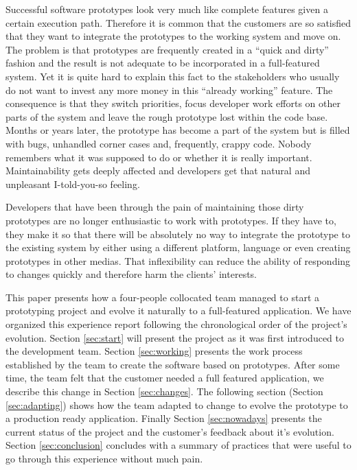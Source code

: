 \documentclass[lnbip]{svmultln}
\begin{document}
Successful software prototypes look very much like complete features
given a certain execution path. Therefore it is common that the
customers are so satisfied that they want to integrate the prototypes
to the working system and move on. The problem is that prototypes are
frequently created in a ``quick and dirty'' fashion and the result is
not adequate to be incorporated in a full-featured system. Yet it is
quite hard to explain this fact to the stakeholders who usually do not
want to invest any more money in this ``already working'' feature. The
consequence is that they switch priorities, focus developer work
efforts on other parts of the system and leave the rough prototype
lost within the code base. Months or years later, the prototype has
become a part of the system but is filled with bugs, unhandled corner
cases and, frequently, crappy code. Nobody remembers what it was
supposed to do or whether it is really important. Maintainability gets
deeply affected and developers get that natural and unpleasant
I-told-you-so feeling. %

Developers that have been through the pain of maintaining those dirty
prototypes are no longer enthusiastic to work with prototypes. If they
have to, they make it so that there will be absolutely no way to
integrate the prototype to the existing system by either using a
different platform, language or even creating prototypes in other
medias. That inflexibility can reduce the ability of responding to
changes quickly and therefore harm the clients' interests.

This paper presents how a four-people collocated team managed to start
a prototyping project and evolve it naturally to a full-featured
application.  We have organized this experience report following the
chronological order of the project's evolution. Section
\ref{sec:start} will present the project as it was first introduced to
the development team. Section \ref{sec:working} presents the work
process established by the team to create the software based on
prototypes. After some time, the team felt that the customer needed a
full featured application, we describe this change in Section
\ref{sec:changes}. The following section (Section \ref{sec:adapting})
shows how the team adapted to change to evolve the prototype to a
production ready application. Finally Section \ref{sec:nowadays}
presents the current status of the project and the customer's feedback
about it's evolution. Section \ref{sec:conclusion} concludes with a
summary of practices that were useful to go through this experience
without much pain.
\end{document}
